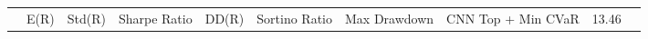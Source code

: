 \begin{tabular}{lrrrrrrrrr}
 & E(R) & Std(R) & Sharpe Ratio & DD(R) & Sortino Ratio & Max Drawdown & %
CNN Top + Min CVaR & 13.46%
\end{tabular}
